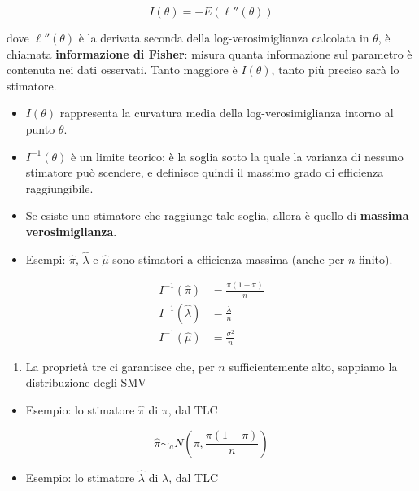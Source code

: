 \documentclass[
  11pt,
]{book}
\providecommand{\tightlist}{%
  \setlength{\itemsep}{0pt}\setlength{\parskip}{0pt}}
\theoremstyle{mytheoremstyle}
\theoremstyle{mydefstyle}
\begin{document}
\[
I(\theta) = -E(\ell''(\theta))
\]

dove \(\ell''(\theta)\) è la derivata seconda della log-verosimiglianza calcolata in \(\theta\), è chiamata \textbf{informazione di Fisher}: misura quanta informazione sul parametro è contenuta nei dati osservati. Tanto maggiore è \(I(\theta)\), tanto più preciso sarà lo stimatore.

\begin{itemize}
\tightlist
\item
  \(I(\theta)\) rappresenta la curvatura media della log-verosimiglianza intorno al punto \(\theta\).
\item
  \(I^{-1}(\theta)\) è un limite teorico: è la soglia sotto la quale la varianza di nessuno stimatore può scendere, e definisce quindi il massimo grado di efficienza raggiungibile.
\item
  Se esiste uno stimatore che raggiunge tale soglia, allora è quello di \textbf{massima verosimiglianza}.
\item
  Esempi: \(\hat\pi\), \(\hat\lambda\) e \(\hat\mu\) sono stimatori a efficienza massima (anche per \(n\) finito).
\end{itemize}

\[
\begin{aligned}
I^{-1}(\hat\pi) &= \frac{\pi(1 - \pi)}{n} \\
I^{-1}(\hat\lambda) &= \frac{\lambda}{n} \\
I^{-1}(\hat\mu) &= \frac{\sigma^2}{n}
\end{aligned}
\]

\begin{enumerate}
\def\labelenumi{\arabic{enumi}.}
\setcounter{enumi}{2}
\tightlist
\item
  La proprietà tre ci garantisce che, per \(n\) sufficientemente alto, sappiamo
  la distribuzione degli SMV
\end{enumerate}

\begin{itemize}
\tightlist
\item
  Esempio: lo stimatore \(\hat\pi\) di \(\pi\), dal TLC
\end{itemize}

\[
  \hat\pi\mathop{\sim}_a N\left(\pi,\frac{\pi(1-\pi)}{n}\right)
  \]

\begin{itemize}
\tightlist
\item
  Esempio: lo stimatore \(\hat\lambda\) di \(\lambda\), dal TLC
\end{itemize}
\end{document}
